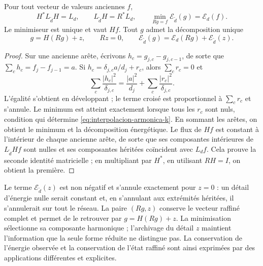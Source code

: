 \begin{theorem}
\label{thm:energia-schur-refinamiento}
Pour tout vecteur de valeurs anciennes \(f\),
\begin{equation}
 H^*L_{\widetilde d}H=L_d,
 \qquad L_{\widetilde d}H=R^*L_d,
 \qquad
 \min_{Rg=f}\mathcal E_{\widetilde d}(g)=\mathcal E_d(f).
 \label{eq:isometria-energia-k}
\end{equation}
Le minimiseur est unique et vaut \(Hf\). Tout \(g\) admet la
décomposition unique
\begin{equation}
 g=H(Rg)+z,\qquad Rz=0,
 \qquad
 \mathcal E_{\widetilde d}(g)
 =\mathcal E_d(Rg)+\mathcal E_{\widetilde d}(z).
 \label{eq:detalle-energia-k}
\end{equation}
\end{theorem}
\begin{proof}
Sur une ancienne arête, écrivons \(h_c=g_{j,c}-g_{j,c-1}\), de sorte que \(\sum_ch_c=f_j-f_{j-1}=a\). Si \(h_c=\delta_{j,c}a/d_j+r_c\), alors \(\sum_cr_c=0\) et
\[
 \sum_c\frac{|h_c|^2}{\delta_{j,c}}
 =\frac{|a|^2}{d_j}+\sum_c\frac{|r_c|^2}{\delta_{j,c}}.
\]
L’égalité s’obtient en développant ; le terme croisé est proportionnel à
\(\sum_cr_c\) et s’annule. Le minimum est atteint exactement lorsque
tous les \(r_c\) sont nuls, condition qui détermine
\eqref{eq:interpolacion-armonica-k}. En sommant les arêtes, on obtient
le minimum et la décomposition énergétique. Le flux de \(Hf\) est
constant à l’intérieur de chaque ancienne arête, de sorte que ses composantes
intérieures de \(L_{\widetilde d}Hf\) sont nulles et ses composantes héritées
coïncident avec \(L_df\). Cela prouve la seconde identité matricielle ; en
multipliant par \(H^*\), en utilisant \(RH=I\), on obtient la première.
\end{proof}

Le terme \(\mathcal E_{\widetilde d}(z)\) est non négatif et s’annule
exactement pour \(z=0\) : un détail d’énergie nulle serait constant et,
en s’annulant aux extrémités héritées, il s’annulerait sur tout le réseau.
La paire \((Rg,z)\) conserve le vecteur raffiné complet et permet
de le retrouver par \(g=H(Rg)+z\). La minimisation sélectionne sa
composante harmonique ; l’archivage du détail \(z\) maintient
l’information que la seule forme réduite ne distingue pas. La conservation
de l’énergie observée et la conservation de l’état raffiné sont
ainsi exprimées par des applications différentes et explicites.


